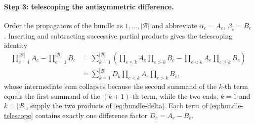 \documentclass[11pt,a4paper]{article}
\newcommand{\cB}{\mathcal B}
\begin{document}
\paragraph{Step 3: telescoping the antisymmetric difference.}
Order the propagators of the bundle as $1,\dots,|\cB|$ and abbreviate $\alpha_e=A_e$, $\beta_e=B_e$. Inserting
and subtracting successive partial products gives the telescoping identity
\begin{equation}
\begin{split}
  \prod_{e=1}^{|\cB|}A_e-\prod_{e=1}^{|\cB|}B_e
  &=\sum_{k=1}^{|\cB|}\left(\prod_{e\leq k}A_e\prod_{e>k}B_e
  -\prod_{e< k}A_e\prod_{e\geq k}B_e\right)\\
  &=\sum_{k=1}^{|\cB|}D_k\prod_{e<k}A_e\prod_{e>k}B_e ,
\end{split}
  \label{eq:bundle-telescope}
\end{equation}
whose intermediate sum collapses because the second summand of the $k$-th term equals the first
summand of the $(k{+}1)$-th term, while the two ends, $k=1$ and $k=|\cB|$, supply the two
products of \eqref{eq:bundle-delta}. Each term of \eqref{eq:bundle-telescope} contains exactly one
difference factor $D_e=A_e-B_e$.
\end{document}
